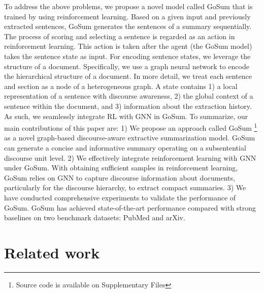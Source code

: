 To address the above problems, we propose a novel model called GoSum that is trained by using reinforcement learning.
Based on a given input and previously extracted sentences, GoSum generates the sentences of a summary sequentially.  
The process of scoring and selecting a sentence is regarded as an action in reinforcement learning.
This action is taken after the agent (the GoSum model) takes the  sentence state as input.
For encoding sentence states, we  leverage the  structure of a document.
Specifically,  we  use  a graph neural network to encode  the hierarchical structure of a document.
In more detail, we treat each sentence and section as a node of a heterogeneous graph.
 A state contains 1) a local representation of a sentence with discourse awareness, 2) the global context of a sentence within the document, and 3) information about  the extraction history.
As such, we seamlessly integrate RL with GNN in GoSum. To summarize, our main contributions of this paper are:
1) We propose an  approach called GoSum \footnote{Source code is available  on Supplementary Files} as a novel graph-based discourse-aware extractive summarization model. GoSum can  generate a concise and informative summary operating on a subsentential discourse unit level. 2) We effectively integrate reinforcement learning with GNN under GoSum. With obtaining sufficient samples in reinforcement learning,  GoSum relies on GNN to capture discourse information about documents, particularly for the discourse hierarchy, to extract  compact summaries. 3) We have conducted comprehensive experiments to validate the performance of GoSum. GoSum has achieved state-of-the-art performance compared with strong baselines on two benchmark datasets: PubMed and arXiv.

\section{Related work}
\label{sec:relate}

